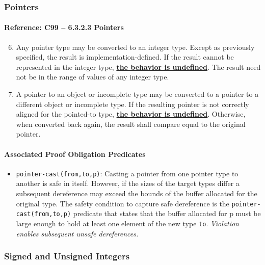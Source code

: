 \documentclass[11pt]{article}
\begin{document}
\subsubsection{Pointers}

\paragraph{Reference: C99 -- 6.3.2.3 Pointers}

\begin{enumerate}
\setcounter{enumi}{5}
\item Any pointer type may be converted to an integer type. Except as previously 
specified, the result is implementation-defined. If the result cannot be 
represented in the integer type, \underline{\bf the behavior is undefined}. 
The result 
need not be in the range of values of any integer type.
\item A pointer to an object or incomplete type may be converted to a pointer 
to a different object or incomplete type. If the resulting pointer is not correctly 
aligned for the pointed-to type, \underline{\bf the behavior is undefined}. 
Otherwise, when 
converted back again, the result shall compare equal to the original pointer.
\end{enumerate}

\paragraph{Associated Proof Obligation Predicates}
\begin{itemize}
\item {\tt pointer-cast(from,to,p)}:
Casting a pointer from one pointer type to another is safe in itself. However,
if the sizes of the target types differ a subsequent dereference may exceed
the bounds of the buffer allocated for the original type. The safety
condition to  capture safe dereference is the {\tt pointer-cast(from,to,p)} 
predicate that states
that the buffer allocated for p must be large enough to hold at least one element of
the new type {\tt to}. \emph{Violation enables subsequent unsafe dereferences.}
\end{itemize}

\subsubsection{Signed and Unsigned Integers}
\label{app:signed}
\end{document}
